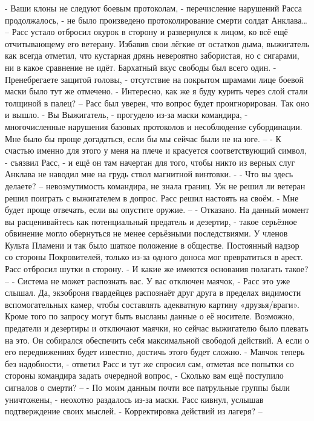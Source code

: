 \documentclass[a4paper, 12pt]{report}
\begin{document}
	- Ваши клоны не следуют боевым протоколам, - перечисление нарушений Расса продолжалось, - не было произведено протоколирование смерти солдат Анклава… –
	Расс устало отбросил окурок в сторону и развернулся к лицом, ко всё ещё отчитывающему  его ветерану. Избавив свои лёгкие от остатков дыма, выжигатель как всегда отметил, что кустарная дрянь невероятно забористая, но с сигарами, ни в какое сравнение не идёт. Бархатный вкус свободы был всего один.
	- Пренебрегаете защитой головы, - отсутствие на покрытом шрамами лице боевой маски было тут же отмечено.
	- Интересно, как же я буду курить через слой стали толщиной в палец? – Расс был уверен, что вопрос будет проигнорирован. Так оно и вышло.
	- Вы Выжигатель, - прогудело из-за маски командира, - многочисленные нарушения базовых протоколов и несоблюдение субординации. Мне было бы проще догадаться, если бы мы сейчас были не на юге. –
	- К счастью именно для этого у меня на плече и красуется соответствующий символ, - съязвил Расс, - и ещё он там начертан для того, чтобы никто из верных слуг Анклава не наводил мне на грудь ствол магнитной винтовки. -
	- Что вы здесь делаете? – невозмутимость командира, не знала границ. Уж не решил ли ветеран решил поиграть с выжигателем в допрос. Расс решил настоять на своём.
	- Мне будет проще отвечать, если вы опустите оружие. –
	- Отказано. На данный момент вы расценивайтесь как потенциальный предатель и дезертир, - такое серьёзное обвинение могло обернуться не менее серьёзными последствиями. У членов Культа Пламени и так было шаткое положение в обществе. Постоянный надзор со стороны Покровителей, только из-за одного доноса мог превратиться в арест.
	Расс отбросил шутки в сторону.
	- И какие же имеются основания полагать такое? –
	- Система не может распознать вас. У вас отключен маячок, - Расс это уже слышал. Да, экзоброня гвардейцев распознаёт друг друга в пределах видимости вспомогательных камер, чтобы составлять адекватную картину «друзья/враги». Кроме того по запросу могут быть высланы данные о её носителе. Возможно, предатели и дезертиры и отключают маячки, но сейчас выжигателю было плевать на это. Он собирался обеспечить себя максимальной свободой действий. А если о его передвижениях будет известно, достичь этого будет сложно.
	- Маячок теперь без надобности, - ответил Расс и тут же спросил сам, отметая все попытки со стороны командира задать очередной вопрос, - Сколько вам ещё поступило сигналов о смерти? –
	- По моим данным почти все патрульные группы были уничтожены, - неохотно раздалось из-за маски. Расс кивнул, услышав подтверждение своих мыслей.
	- Корректировка действий из лагеря? –
\end{document}
